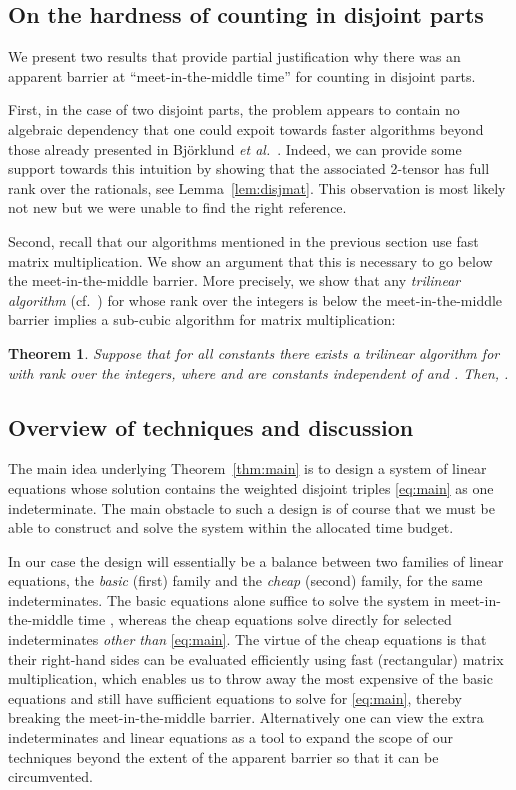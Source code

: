 \documentclass{amsart}
\newtheorem{Thm}{Theorem}
\begin{document}
\subsection{On the hardness of counting in disjoint parts}

We present two results that provide partial
justification why there was an apparent barrier 
at ``meet-in-the-middle time'' for counting in disjoint parts. 

First, in the case of two disjoint parts, the problem appears to
contain no algebraic dependency that one could expoit towards
faster algorithms beyond those already presented in 
Bj\"orklund {\em et al.}~\cite{BHKK08,BHKK09}. Indeed, we can
provide some support towards this intuition by showing that
the associated 2-tensor has full rank over the rationals, see Lemma~\ref{lem:disjmat}.
This observation is most likely not new but we were unable to find the right reference.

Second, recall that our algorithms mentioned in the previous section use fast matrix multiplication. 
We show an argument that this is necessary to go below the meet-in-the-middle barrier.
More precisely, we show that any {\em trilinear algorithm} (cf.~\cite[\S9]{Pan1984})
for  whose rank over the integers is below the 
meet-in-the-middle barrier implies a sub-cubic algorithm for matrix 
multiplication:

\begin{Thm}
\label{thm:omega-tau}
Suppose that for all constants  there exists
a trilinear algorithm for  with 
rank  over the integers,
where  and  are constants 
independent of  and . 
Then, .
\end{Thm}

\subsection{Overview of techniques and discussion}

The main idea underlying Theorem~\ref{thm:main} is to design
a system of linear equations whose solution contains the weighted 
disjoint triples \eqref{eq:main} as one indeterminate. The main obstacle
to such a design is of course that we must be able to construct 
and solve the system within the allocated time budget.

In our case the design will essentially be a balance between
two families of linear equations, the {\em basic} (first) family and
the {\em cheap} (second) family, for the same indeterminates. The basic 
equations alone suffice to solve 
the system in meet-in-the-middle time , whereas
the cheap equations solve directly for selected indeterminates 
{\em other than} \eqref{eq:main}. The virtue of the cheap equations 
is that their right-hand sides can be evaluated efficiently using 
fast (rectangular) matrix multiplication, which enables us to throw 
away the most expensive of the basic equations and still have sufficient 
equations to solve for \eqref{eq:main}, thereby breaking the 
meet-in-the-middle barrier. Alternatively one can view the 
extra indeterminates and linear equations as a tool to expand
the scope of our techniques beyond the extent of the apparent 
barrier so that it can be circumvented.
\end{document}
